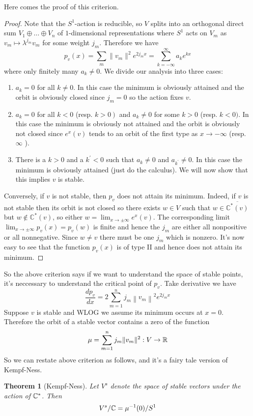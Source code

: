 \documentclass[11pt]{amsart}
\numberwithin{equation}{section}
\theoremstyle{plain}
\theoremstyle{plain}
\newtheorem{thmsub}{Theorem}[subsection]
\numberwithin{equation}{section}
\begin{document}
Here comes the proof of this criterion.
\begin{proof}
Note that the $S^1$-action is reducible, so $V$ splits into an orthogonal direct sum $V_1\oplus\dots\oplus V_n$ of $1$-dimensional representations where $S^1$ acts on $V_m$ as $v_m\mapsto \lambda^{j_m}v_m$ for some weight $j_m$. Therefore we have
$$
p_v(x)=\sum_m\|v_m\|^2e^{2j_mx}=\sum_{k=-\infty}^{\infty}a_ke^{kx}
$$
where only finitely many $a_k\neq0$. We divide our analysis into three cases:
\begin{enumerate}[$1.$]
\item $a_{k}=0$ for all $k \neq 0$. In this case the minimum is obviously attained and the orbit is obviously closed since $j_{m}=0$ so the action fixes $v$.
\item $a_{k}=0$ for all $k<0$ (resp. $\left.k>0\right)$ and $a_{k} \neq 0$ for some $k>0$ (resp. $k<0)$. In this case the minimum is obviously not attained and the orbit is obviously not closed since $e^{x}(v)$ tends to an orbit of the first type as $x \rightarrow-\infty$ (resp. $\infty$ ).
\item There is a $k>0$ and a $k^{\prime}<0$ such that $a_{k} \neq 0$ and $a_{k^{\prime}} \neq 0$. In this case the minimum is obviously attained (just do the calculus). We will now show that this implies $v$ is stable.
\end{enumerate}

Conversely, if $v$ is not stable, then $p_v$ does not attain its minimum. Indeed, if $v$ is not stable then its orbit is not closed so there exists $w \in V$ such that $w \in \overline{\mathbb{C}^{*}(v)}$ but $w \notin \mathbb{C}^{*}(v)$, so either $w=\lim _{x \rightarrow \pm \infty} e^{x}(v)$. The corresponding limit $\lim _{x \rightarrow \pm \infty} p_{v}(x)=p_{v}(w)$ is finite and hence the $j_{m}$ are either all nonpositive or all nonnegative. Since $w \neq v$ there must be one $j_{m}$ which is nonzero. It's now easy to see that the function $p_{v}(x)$ is of type II and hence does not attain its minimum.
\end{proof}
So the above criterion says if we want to understand the space of stable points, it's neccessary to understand the critical point of $p_v$. Take derivative we have
$$
\frac{d p_{v}}{d x}=2 \sum_{m=1}^{n} j_{m}\left\|v_{m}\right\|^{2} e^{2 j_{m} x}
$$
Suppose $v$ is stable and WLOG we assume its minimum occurs at $x=0$. Therefore the orbit of a stable vector contains a zero of the function
$$
\mu=\sum_{m=1}^nj_m\|v_m\|^2:V\to\Bbb{R}
$$
So we can restate above criterion as follows, and it's a fairy tale version of Kempf-Ness.
\begin{thmsub}[Kempf-Ness]
Let $V^s$ denote the space of stable vectors under the action of $\Bbb{C}^*$. Then
$$
V^s/\Bbb{C}=\mu^{-1}(0)/S^1
$$
\end{thmsub} 
\end{document}
